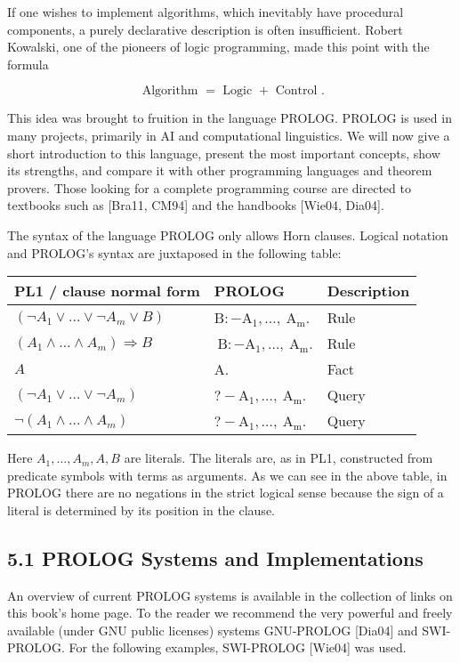 \documentclass[10pt]{article}
\begin{document}
If one wishes to implement algorithms, which inevitably have procedural components, a purely declarative description is often insufficient. Robert Kowalski, one of the pioneers of logic programming, made this point with the formula

$$
\text { Algorithm }=\text { Logic }+ \text { Control } .
$$

This idea was brought to fruition in the language PROLOG. PROLOG is used in many projects, primarily in AI and computational linguistics. We will now give a short introduction to this language, present the most important concepts, show its strengths, and compare it with other programming languages and theorem provers. Those looking for a complete programming course are directed to textbooks such as [Bra11, CM94] and the handbooks [Wie04, Dia04].

The syntax of the language PROLOG only allows Horn clauses. Logical notation and PROLOG's syntax are juxtaposed in the following table:

\begin{center}
\begin{tabular}{lll}
\hline
PL1 / clause normal form & PROLOG & Description \\
\hline
$\left(\neg A_{1} \vee \ldots \vee \neg A_{m} \vee B\right)$ & $\mathrm{B}:-\mathrm{A}_{1}, \ldots, \mathrm{~A}_{\mathrm{m}}$. & Rule \\
\hline
$\left(A_{1} \wedge \ldots \wedge A_{m}\right) \Rightarrow B$ & $\mathrm{~B}:-\mathrm{A}_{1}, \ldots, \mathrm{~A}_{\mathrm{m}}$. & Rule \\
\hline
$A$ & A. & Fact \\
\hline
$\left(\neg A_{1} \vee \ldots \vee \neg A_{m}\right)$ & $?-\mathrm{A}_{1}, \ldots, \mathrm{~A}_{\mathrm{m}}$. & Query \\
\hline
$\neg\left(A_{1} \wedge \ldots \wedge A_{m}\right)$ & $?-\mathrm{A}_{1}, \ldots, \mathrm{~A}_{\mathrm{m}}$. & Query \\
\hline
\end{tabular}
\end{center}

Here $A_{1}, \ldots, A_{m}, A, B$ are literals. The literals are, as in PL1, constructed from predicate symbols with terms as arguments. As we can see in the above table, in PROLOG there are no negations in the strict logical sense because the sign of a literal is determined by its position in the clause.

\subsection*{5.1 PROLOG Systems and Implementations}
An overview of current PROLOG systems is available in the collection of links on this book's home page. To the reader we recommend the very powerful and freely available (under GNU public licenses) systems GNU-PROLOG [Dia04] and SWI-PROLOG. For the following examples, SWI-PROLOG [Wie04] was used.
\end{document}
